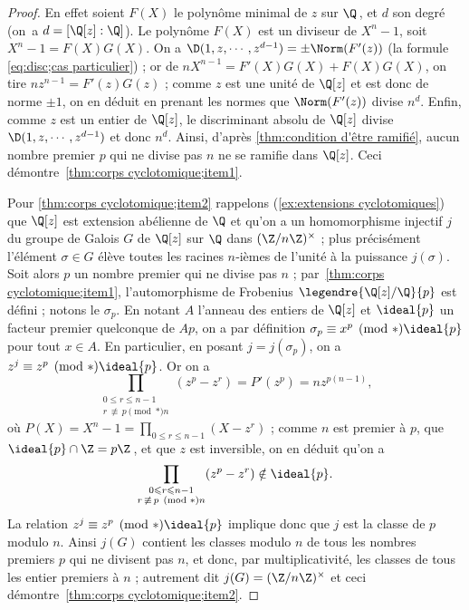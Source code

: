 \documentclass[11pt, useosf,
  title in boldface,
  theorem in new line,
  theorem numbering = section,
  number theorems separately,
]{simplivre}
\begin{document}
    \begin{proof}
        En effet soient \( F(X) \) le polynôme minimal de \( z \) sur \( \Q \)\,, et \( d \) son degré (on~a \( d = [\Q[z]:\Q] \)). Le polynôme \( F(X) \) est un diviseur de \( X^n-1 \), soit \( X^n-1 = F(X)G(X) \). On a \( \D(1, z, \cdots, z^{d-1}) = \pm \Norm(F'(z)) \) (la formule \eqref{eq:disc;cas particulier}) ; or de \( n X^{n-1} = F'(X)G(X) + F(X)G(X) \), on tire \( n z^{n-1} = F'(z)G(z) \) ; comme \( z \) est une unité de \( \Q[z] \) et est donc de norme \( \pm 1 \), on en déduit en prenant les normes que \( \Norm(F'(z)) \) divise \( n^d \). Enfin, comme \( z \) est un entier de \( \Q[z] \), le discriminant absolu de \( \Q[z] \) divise \( \D(1, z, \cdots, z^{d-1}) \) et donc \( n^d \). Ainsi, d'après \cref{thm:condition d'être ramifié}, aucun nombre premier \( p \) qui ne divise pas \( n \) ne se ramifie dans \( \Q[z] \). Ceci démontre~\ref{thm:corps cyclotomique;item1}.

        Pour \ref{thm:corps cyclotomique;item2} rappelons (\cref{ex:extensions cyclotomiques}) que \( \Q[z] \) est extension abélienne de \( \Q \) et qu'on a un homomorphisme injectif \( j \) du groupe de Galois \( G \) de \( \Q[z] \) sur \( \Q \) dans \( (\Z/n\Z)^\times \) ; plus précisément l'élément \( \sigma \in G \) élève toutes les racines \( n \)‑ièmes de l'unité à la puissance \( j(\sigma) \). Soit alors \( p \) un nombre premier qui ne divise pas \( n \) ; par~\ref{thm:corps cyclotomique;item1}, l'automorphisme de Frobenius \( \legendre{\Q[z]/\Q}{p} \) est défini ; notons le \( \sigma_p \). En notant \( A \) l'anneau des entiers de \( \Q[z] \) et \( \ideal{p} \) un facteur premier quelconque de \( Ap \), on a par définition \( \sigma_p \equiv x^p \pmod*{\ideal{p}} \) pour tout \( x \in A \). En particulier, en posant \( j = j(\sigma_p) \), on a \( z^j \equiv z^p \pmod*{\ideal{p}} \). Or on a
        \[
            \prod_{\substack{0 \leqslant r \leqslant n-1 \\ r \,\not\equiv\, p \pmod*{n}}} (z^p-z^r) = P'(z^p) = n z^{p(n-1)},
        \]
        où \( P(X) = X^n-1 = \prod_{0 \leqslant r \leqslant n-1} (X-z^r) \) ; comme \( n \) est premier à \( p \), que \( \ideal{p} \cap \Z = p\Z \)\,, et que \( z \) est inversible, on en déduit qu'on a
        \[
            \prod_{\substack{0 \leqslant r \leqslant n-1 \\ r \,\not\equiv\, p \pmod*{n}}} (z^p-z^r) \notin \ideal{p}.
        \]
        La relation \( z^j \equiv z^p \pmod*{\ideal{p}} \) implique donc que \( j \) est la classe de \( p \) modulo \( n \). Ainsi \( j(G) \) contient les classes modulo \( n \) de tous les nombres premiers \( p \) qui ne divisent pas \( n \), et donc, par multiplicativité, les classes de tous les entier premiers à \( n \) ; autrement dit \( j(G) = (\Z/n\Z)^\times \) et ceci démontre~\ref{thm:corps cyclotomique;item2}.
    \end{proof}
\end{document}
